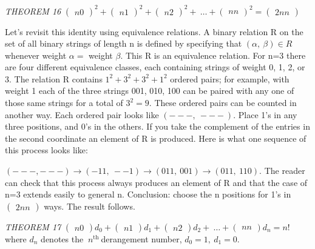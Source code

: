 \documentclass[10pt,letter]{article}
\begin{document}
\emph{THEOREM 16} \(\begin{pmatrix}
n
0
\end{pmatrix}
^{2} +
\begin{pmatrix}
n
1
\end{pmatrix}
^{2} +
\begin{pmatrix}
n
2
\end{pmatrix}
^{2} + \ \ldots +
\begin{pmatrix}
n
n
\end{pmatrix}
^{2} =
\begin{pmatrix}
2n
n
\end{pmatrix}
\)

Let's revisit this identity using equivalence relations. A binary
relation R on the set of all binary strings of length n is defined by
specifying that \(\left( \alpha,\ \beta \right) \in R\) whenever weight
\(\alpha =\) weight \(\beta\). This R is an equivalence relation. For
n=3 there are four different equivalence classes, each containing
strings of weight 0, 1, 2, or 3. The relation R contains
\(1^{2} + 3^{2} + 3^{2} + 1^{2}\) ordered pairs; for example, with
weight 1 each of the three strings 001, 010, 100 can be paired with any
one of those same strings for a total of \(3^{2} = 9\). These ordered
pairs can be counted in another way. Each ordered pair looks like
\(\left( - - - ,\  - - - \right).\) Place 1's in any three positions,
and 0's in the others. If you take the complement of the entries in the
second coordinate an element of R is produced. Here is what one sequence
of this process looks like:

\(\left( - - - , - - - \right) \rightarrow \left( - 11,\  - - 1 \right) \rightarrow \left( 011,\ 001 \right) \rightarrow (011,\ 110)\).
The reader can check that this process always produces an element of R
and that the case of n=3 extends easily to general n. Conclusion: choose
the n positions for 1's in \(\begin{pmatrix}
2n
n
\end{pmatrix}
\) ways. The result follows.

\emph{THEOREM 17} \(\begin{pmatrix}
n
0
\end{pmatrix}
d_{0} +
\begin{pmatrix}
n
1
\end{pmatrix}
d_{1} +
\begin{pmatrix}
n
2
\end{pmatrix}
d_{2} + \ \ldots +
\begin{pmatrix}
n
n
\end{pmatrix}
d_{n} = n!\) where \(d_{n}\) denotes the
\(\ n^{\text{th}}\ \)derangement number, \(d_{0} = 1,\ d_{1} = 0.\)
\end{document}
